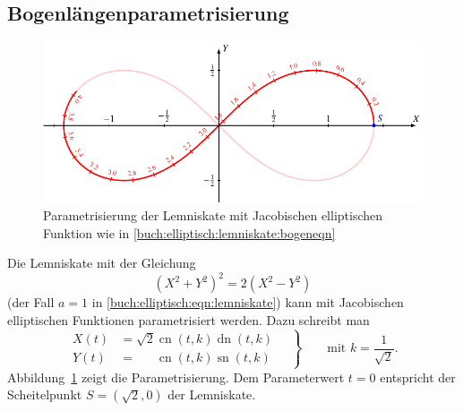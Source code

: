 \subsection{Bogenlängenparametrisierung}
\begin{figure}
\centering
\includegraphics{chapters/110-elliptisch/images/lemnispara.pdf}
\caption{Parametrisierung der Lemniskate mit Jacobischen elliptischen
Funktion wie in \eqref{buch:elliptisch:lemniskate:bogeneqn}
\label{buch:elliptisch:lemniskate:bogenpara}}
\end{figure}
Die Lemniskate mit der Gleichung
\[
(X^2+Y^2)^2=2(X^2-Y^2)
\]
(der Fall $a=1$ in \eqref{buch:elliptisch:eqn:lemniskate})
kann mit Jacobischen elliptischen Funktionen
parametrisiert werden.
Dazu schreibt man
\begin{equation}
\left.
\begin{aligned}
X(t)
&=
\sqrt{2}\operatorname{cn}(t,k) \operatorname{dn}(t,k)
\\
Y(t)
&=
\phantom{\sqrt{2}}
\operatorname{cn}(t,k) \operatorname{sn}(t,k)
\end{aligned}
\quad\right\}
\qquad\text{mit $k=\displaystyle\frac{1}{\sqrt{2}}.$}
\label{buch:elliptisch:lemniskate:bogeneqn}
\end{equation}
Abbildung~\ref{buch:elliptisch:lemniskate:bogenpara} zeigt die
Parametrisierung. 
Dem Parameterwert $t=0$ entspricht der Scheitelpunkt
$S=(\!\sqrt{2},0)$ der Lemniskate.

%
%
